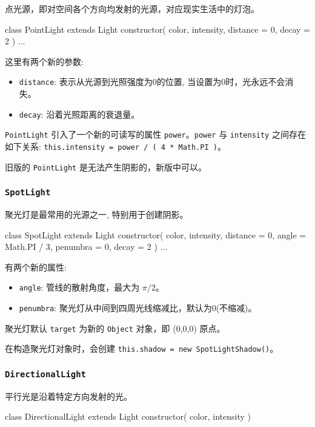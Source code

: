 点光源，即对空间各个方向均发射的光源，对应现实生活中的灯泡。

\begin{JavaScript}
class PointLight extends Light {
  constructor( color, intensity, distance = 0, decay = 2 )
  ...
}
\end{JavaScript}

这里有两个新的参数:
\begin{itemize}
  \item \texttt{distance}: 表示从光源到光照强度为0的位置, 当设置为0时，光永远不会消失。
  \item \texttt{decay}: 沿着光照距离的衰退量。
\end{itemize}

\texttt{PointLight} 引入了一个新的可读写的属性 \texttt{power}。\texttt{power} 与 \texttt{intensity} 之间存在如下关系: \texttt{this.intensity = power / ( 4 * Math.PI )}。

旧版的 \texttt{PointLight} 是无法产生阴影的，新版中可以。

\subsubsection*{\texttt{SpotLight}}

聚光灯是最常用的光源之一, 特别用于创建阴影。

\begin{JavaScript}
class SpotLight extends Light {
  constructor( color, intensity, distance = 0, angle = Math.PI / 3, penumbra = 0, decay = 2 ) 
  ...
}
\end{JavaScript}

有两个新的属性:
\begin{itemize}
  \item \texttt{angle}: 管线的散射角度，最大为 $\pi/2$。
  \item \texttt{penumbra}: 聚光灯从中间到四周光线缩减比，默认为0(不缩减)。
\end{itemize}

聚光灯默认 \texttt{target} 为新的 \texttt{Object} 对象，即 (0,0,0) 原点。

在构造聚光灯对象时，会创建 \texttt{this.shadow = new SpotLightShadow()}。

\subsubsection*{\texttt{DirectionalLight}}

平行光是沿着特定方向发射的光。

\begin{JavaScript}
class DirectionalLight extends Light {
	constructor( color, intensity )
}
\end{JavaScript}

